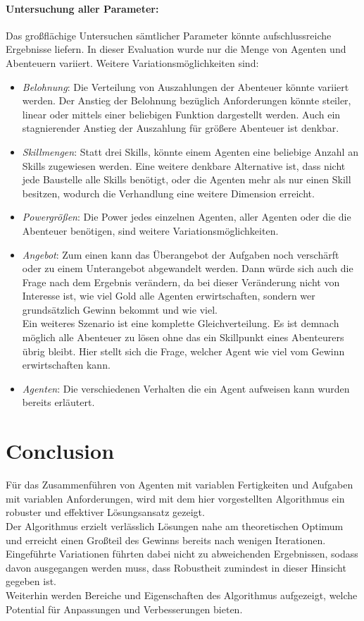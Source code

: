 \documentclass[fleqn,10pt]{SelfArx} %
\begin{document}
\paragraph{Untersuchung aller Parameter:}
Das großflächige Untersuchen sämtlicher Parameter könnte aufschlussreiche Ergebnisse liefern. In dieser Evaluation wurde nur die Menge von Agenten und Abenteuern variiert. Weitere Variationsmöglichkeiten sind:
\begin{itemize}
	\item \textit{Belohnung}: Die Verteilung von Auszahlungen der Abenteuer könnte variiert werden. Der Anstieg der Belohnung bezüglich Anforderungen könnte steiler, linear oder mittels einer beliebigen Funktion dargestellt werden. Auch ein stagnierender Anstieg der Auszahlung für größere Abenteuer ist denkbar.
	\item \textit{Skillmengen}: Statt drei Skills, könnte einem Agenten eine beliebige Anzahl an Skills zugewiesen werden. Eine weitere denkbare Alternative ist, dass nicht jede Baustelle alle Skills benötigt, oder die Agenten mehr als nur einen Skill besitzen, wodurch die Verhandlung eine weitere Dimension erreicht. 
	\item \textit{Powergrößen}: Die Power jedes einzelnen Agenten, aller Agenten oder die die Abenteuer benötigen, sind weitere Variationsmöglichkeiten.
	\item \textit{Angebot}: Zum einen kann das Überangebot der Aufgaben noch verschärft oder zu einem Unterangebot abgewandelt werden. Dann würde sich auch die Frage nach dem Ergebnis verändern, da bei dieser Veränderung nicht von Interesse ist, wie viel Gold alle Agenten erwirtschaften, sondern wer grundsätzlich Gewinn bekommt und wie viel. \\
	Ein weiteres Szenario ist eine komplette Gleichverteilung. Es ist demnach möglich alle Abenteuer zu lösen ohne das ein Skillpunkt eines Abenteurers übrig bleibt. Hier stellt sich die Frage, welcher Agent wie viel vom Gewinn erwirtschaften kann.
	\item \textit{Agenten}: Die verschiedenen Verhalten die ein Agent aufweisen kann wurden bereits erläutert.
\end{itemize}




\section{Conclusion}
\label{sec:Conclusion}
Für das Zusammenführen von Agenten mit variablen Fertigkeiten und Aufgaben mit variablen Anforderungen, wird mit dem hier vorgestellten Algorithmus ein robuster und effektiver Lösungsansatz gezeigt.\\ Der Algorithmus erzielt verlässlich Lösungen nahe am theoretischen Optimum und erreicht einen Großteil des Gewinns bereits nach wenigen Iterationen. Eingeführte Variationen führten dabei nicht zu abweichenden Ergebnissen, sodass davon ausgegangen werden muss, dass Robustheit zumindest in dieser Hinsicht gegeben ist.\\ Weiterhin werden Bereiche und Eigenschaften des Algorithmus aufgezeigt, welche Potential für Anpassungen und Verbesserungen bieten.
\end{document}
